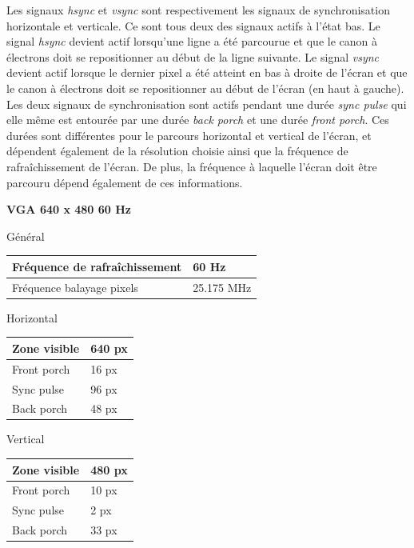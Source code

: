 Les signaux \emph{hsync} et \emph{vsync} sont respectivement les signaux de synchronisation horizontale et verticale. Ce sont tous deux des signaux actifs à l'état bas. Le signal \emph{hsync} devient actif lorsqu'une ligne a été parcourue et que le canon à électrons doit se repositionner au début de la ligne suivante. Le signal \emph{vsync} devient actif lorsque le dernier pixel a été atteint en bas à droite de l'écran et que le canon à électrons doit se repositionner au début de l'écran (en haut à gauche). Les deux signaux de synchronisation sont actifs pendant une durée \emph{sync pulse} qui elle même est entourée par une durée \emph{back porch} et une durée \emph{front porch}. Ces durées sont différentes pour le parcours horizontal et vertical de l'écran, et dépendent également de la résolution choisie ainsi que la fréquence de rafraîchissement de l'écran. De plus, la fréquence à laquelle l'écran doit être parcouru dépend également de ces informations.
\begin{snugshade}
\noindent \textbf{VGA 640 x 480 60 Hz \cite{cite:timingsvga}}
\begin{center}
	Général\\
	\begin{tabular}{| l | l |}
	\hline
	Fréquence de rafraîchissement & 60 Hz\\ \hline
	Fréquence balayage pixels & 25.175 MHz\\ \hline
	\end{tabular}
\end{center}

\begin{center}
	Horizontal\\
	\begin{tabular}{| l | l |}
	\hline
	Zone visible & 640 px\\ \hline
	Front porch & 16 px\\ \hline
	Sync pulse & 96 px\\ \hline
	Back porch & 48 px\\ \hline
	\end{tabular}
\end{center}

\begin{center}
	Vertical\\
	\begin{tabular}{| l | l |}
	\hline
	Zone visible & 480 px\\ \hline
	Front porch & 10 px\\ \hline
	Sync pulse & 2 px\\ \hline
	Back porch & 33 px\\ \hline
	\end{tabular}
\end{center}

\end{snugshade}

